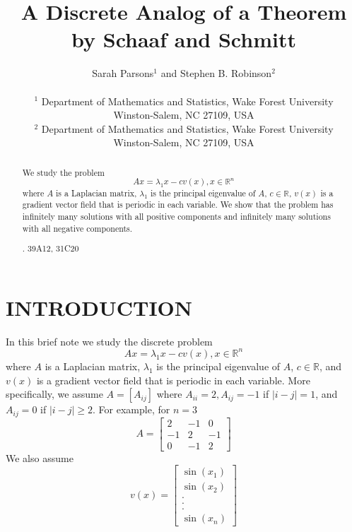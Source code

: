 \documentclass[twoside]{article}
\def\ohead{A Discrete Analog of a Theorem by Schaaf and Schmitt}
\newcommand{\R}{{\mathbb R}}
\begin{document}
\thispagestyle{myheadings}

\setcounter{page}{1} %


\label{firstpage} %

\title{\ohead}
\author{Sarah Parsons$^1$ and Stephen B. Robinson$^2$\\ \\
$^1$ Department of Mathematics and Statistics, Wake Forest University\\
Winston-Salem, NC 27109, USA\\
$^2$ Department of Mathematics and Statistics, Wake Forest University\\
Winston-Salem, NC 27109, USA}
\maketitle


\begin{abstract} We study the problem
\[
Ax=\lambda_1 x-cv(x), x\in\R^n
\]
where $A$ is a Laplacian matrix, $\lambda_1$ is the principal eigenvalue of $A$, $c\in\R$, $v(x)$ is a gradient vector field that is periodic in each variable. We show that the problem has infinitely many solutions with all positive components and infinitely many solutions with all negative components.

. 39A12, 31C20

\vspace{2mm}
\end{abstract}

\pagestyle{headings}
\section{INTRODUCTION}

In this brief note we study the discrete problem
\begin{equation}
Ax=\lambda_1 x-cv(x), x\in\R^n
\label{prob}
\end{equation}
where $A$ is a Laplacian matrix, $\lambda_1$ is the principal eigenvalue of $A$, $c\in\R$, and $v(x)$ is a gradient vector field that is periodic in each variable. More specifically, we assume $A=[A_{ij}]$ where $A_{ii}=2,A_{ij}=-1$ if $|i-j|=1$, and $A_{ij}=0$ if $|i-j|\geq 2$. For example, for $n=3$
\[
A=\begin{bmatrix}
2 & -1 & 0\\
-1 & 2 & -1\\
0 & -1 & 2
\end{bmatrix}
\]
We also assume
\[
 v(x)=\left [\begin{array}{c} \sin(x_1)\\ \sin(x_2) \\ .\\.\\.\\ \sin(x_n)\end{array} \right ]
\]
\end{document}
